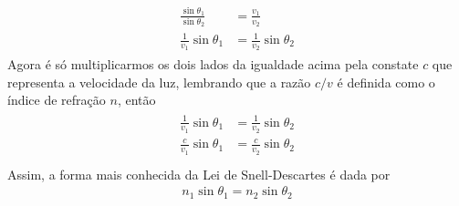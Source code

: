 \begin{align}
    \begin{split}
        \frac{\sin\theta_1}{\sin\theta_2}&=\frac{v_1}{v_2}\\
        \frac{1}{v_1}\sin\theta_1&=\frac{1}{v_2}\sin\theta_2
    \end{split}
\end{align}
Agora é só multiplicarmos os dois lados da igualdade acima pela constate $c$ que representa a velocidade da luz, lembrando que a razão $c/v$ é definida como o índice de refração $n$, então
\begin{align}
    \begin{split}
        \frac{1}{v_1}\sin\theta_1&=\frac{1}{v_2}\sin\theta_2\\
        \frac{c}{v_1}\sin\theta_1&=\frac{c}{v_2}\sin\theta_2\\                                             
    \end{split}                                   
\end{align}
Assim, a forma mais conhecida da Lei de Snell-Descartes é dada por
\begin{align}
    \boxed{
        n_1\sin\theta_1=n_2\sin\theta_2
    } 
\end{align} 
